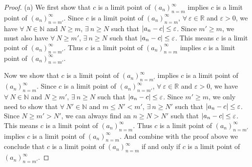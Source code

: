 \begin{proof}{(a)}
We first show that \(c\) is a limit point of \((a_n)_{n = m}^\infty\) implies \(c\) is a limit point of \((a_n)_{n = m'}^\infty\).
Since \(c\) is a limit point of \((a_n)_{n = m}^\infty\), \(\forall\ \varepsilon \in \mathds{R}\) and \(\varepsilon > 0\), we have \(\forall\ N \in \mathds{N}\) and \(N \geq m\), \(\exists\ n \geq N\) such that \(\abs*{a_n - c} \leq \varepsilon\).
Since \(m' \geq m\), we must also have \(\forall\ N \geq m'\), \(\exists\ n \geq N\) such that \(\abs*{a_n - c} \leq \varepsilon\).
This means \(c\) is a limit point of \((a_n)_{n = m'}^\infty\).
Thus \(c\) is a limit point of \((a_n)_{n = m}^\infty\) implies \(c\) is a limit point of \((a_n)_{n = m'}^\infty\).

Now we show that \(c\) is a limit point of \((a_n)_{n = m'}^\infty\) implies \(c\) is a limit point of \((a_n)_{n = m}^\infty\).
Since \(c\) is a limit point of \((a_n)_{n = m'}^\infty\), \(\forall\ \varepsilon \in \mathds{R}\) and \(\varepsilon > 0\), we have \(\forall\ N \in \mathds{N}\) and \(N \geq m'\), \(\exists\ n \geq N\) such that \(\abs*{a_n - c} \leq \varepsilon\).
Since \(m' \geq m\), we only need to show that \(\forall\ N' \in \mathds{N}\) and \(m \leq N' < m'\), \(\exists\ n \geq N'\) such that \(\abs*{a_n - c} \leq \varepsilon\).
Since \(N \geq m' > N'\), we can always find an \(n \geq N > N'\) such that \(\abs*{a_n - c} \leq \varepsilon\).
This means \(c\) is a limit point of \((a_n)_{n = m}^\infty\).
Thus \(c\) is a limit point of \((a_n)_{n = m'}^\infty\) implies \(c\) is a limit point of \((a_n)_{n = m}^\infty\).
And combine with the proof above we conclude that \(c\) is a limit point of \((a_n)_{n = m}^\infty\) if and only if \(c\) is a limit point of \((a_n)_{n = m'}^\infty\).
\end{proof}

